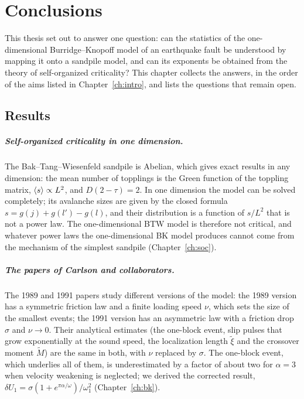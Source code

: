 \chapter{Conclusions}
\label{ch:conclusions}

This thesis set out to answer one question: can the statistics of the one-dimensional Burridge--Knopoff model of an earthquake fault be
understood by mapping it onto a sandpile model, and can its exponents be obtained from the theory of self-organized criticality? This chapter
collects the answers, in the order of the aims listed in Chapter~\ref{ch:intro}, and lists the questions that remain open.

\section{Results}

\paragraph{Self-organized criticality in one dimension.} The Bak--Tang--Wiesenfeld sandpile is Abelian, which gives exact results in any
dimension: the mean number of topplings is the Green function of the toppling matrix, $\left\langle s \right\rangle\propto L^2$, and $D(2-\tau) = 2$. In one dimension
the model can be solved completely; its avalanche sizes are given by the closed formula $s = g(j)+g(l')-g(l)$, and their distribution is a function of
$s/L^2$ that is not a power law. The one-dimensional BTW model is therefore not critical, and whatever power laws the one-dimensional BK model produces
cannot come from the mechanism of the simplest sandpile (Chapter~\ref{ch:soc}).

\paragraph{The papers of Carlson and collaborators.} The 1989 and 1991 papers study different versions of the model: the 1989 version has a symmetric
friction law and a finite loading speed $\nu$, which sets the size of the smallest events; the 1991 version has an asymmetric law with a friction drop
$\sigma$ and $\nu\to0$. Their analytical estimates (the one-block event, slip pulses that grow exponentially at the sound speed, the localization length
$\tilde\xi$ and the crossover moment $\tilde M$) are the same in both, with $\nu$ replaced by $\sigma$. The one-block event, which underlies all of them,
is underestimated by a factor of about two for $\alpha=3$ when velocity weakening is neglected; we derived the corrected result,
$\delta U_1 = \sigma(1+e^{\pi\alpha/\omega})/\omega_1^2$ (Chapter~\ref{ch:bk}).

